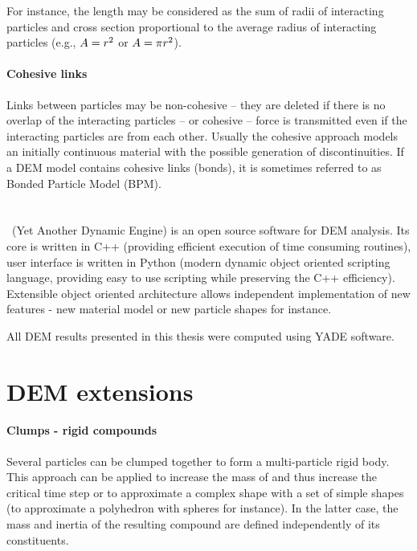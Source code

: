 For instance, the length may be considered as the sum of radii of interacting particles and cross section proportional to the average radius of interacting particles (e.g., $A=r^2$ or $A=\pi r^2$).

\paragraph{Cohesive links}
Links between particles may be non-cohesive
-- they are deleted if there is no overlap of the interacting particles --
or cohesive
-- force is transmitted even if the interacting particles are  from each other.
Usually the cohesive approach models an initially continuous material with the possible generation of discontinuities.
If a DEM model contains cohesive links (bonds), it is sometimes referred to as Bonded Particle Model (BPM).



\section{\YADE}
\YADE\ (Yet Another Dynamic Engine) \cite{yade2015} is an open source software for DEM analysis.
Its core is written in C++ (providing efficient execution of time consuming routines),
user interface is written in Python
(modern dynamic object oriented scripting language, providing easy to use scripting while preserving the C++ efficiency).
Extensible object oriented architecture allows independent implementation of new features - new material model or new particle shapes for instance.

All DEM results presented in this thesis were computed using YADE software.




\section{DEM extensions}\label{secDemDemExtensions}

\paragraph{Clumps - rigid compounds}
Several particles can be clumped together to form a multi-particle rigid body.
This approach can be applied to increase the mass of  and thus increase the critical time step
or
to approximate a complex shape with a set of simple shapes (to approximate a polyhedron with spheres for instance).
In the latter case, the mass and inertia of the resulting compound are defined independently of its constituents.

